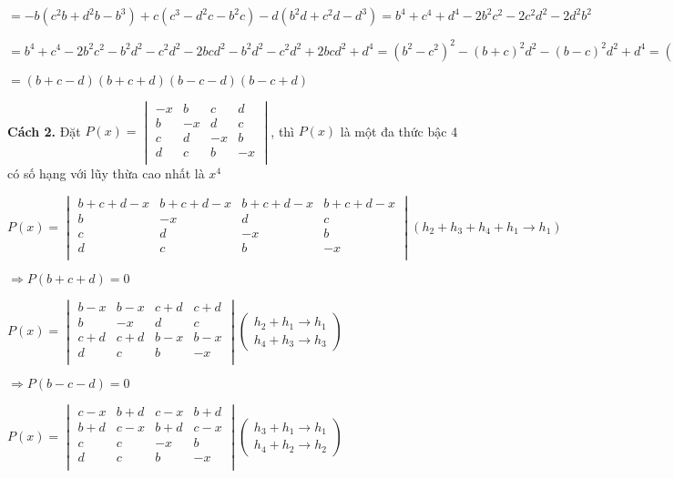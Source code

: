 \documentclass[12pt]{report}
\begin{document}
$= -b\left(c^2b+d^2b-b^3\right) + c\left(c^3-d^2c-b^2c\right) -d\left(b^2d+c^2d-d^3\right) = b^4+c^4+d^4-2b^2c^2-2c^2d^2-2d^2b^2$	

$= b^4+c^4-2b^2c^2-b^2d^2-c^2d^2-2bcd^2-b^2d^2-c^2d^2+2bcd^2+d^4 = \left(b^2-c^2\right)^2-\left(b+c\right)^2d^2-\left(b-c\right)^2d^2+d^4 = \left(b^2-c^2\right)^2d^2 - \left(b^2+c^2\right)^2d^2 - (b-c)^2d^2+d^4 = \lbrack (b+c)^2-d^2 \rbrack \lbrack (b-c)^2-d^2 \rbrack$

$= (b+c-d)(b+c+d)(b-c-d)(b-c+d)$

\textbf{Cách 2.} Đặt $P(x) = \begin{vmatrix}
-x & b & c & d \\
b & -x & d & c \\
c & d & -x & b \\
d & c & b & -x \\
\end{vmatrix}$, thì $P(x)$ là một đa thức bậc 4 có số hạng với lũy thừa cao nhất là $x^4$

$P(x) = \begin{vmatrix}
b+c+d-x & b+c+d-x & b+c+d-x & b+c+d-x \\
b & -x & d & c \\
c & d & -x & b \\
d & c & b & -x \\
\end{vmatrix} (h_2+h_3+h_4+h_1 \to h_1)$

$\Rightarrow P(b+c+d) = 0$

$P(x) = \begin{vmatrix}
	b-x & b-x & c+d & c+d \\
	b & -x & d & c \\
	c+d & c+d & b-x & b-x \\
	d & c & b & -x \\
\end{vmatrix} \left( \begin{smallmatrix}
h_2+h_1 \to h_1\\
h_4+h_3 \to h_3
\end{smallmatrix} \right)$

$\Rightarrow P(b-c-d) = 0$

$P(x) = \begin{vmatrix}
	c-x & b+d & c-x & b+d \\
	b+d & c-x & b+d & c-x \\
	c & c & -x & b \\
	d & c & b & -x \\
\end{vmatrix} \left( \begin{smallmatrix}
	h_3+h_1 \to h_1\\
	h_4+h_2 \to h_2
\end{smallmatrix} \right)$
\end{document}
